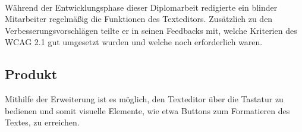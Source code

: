 \mbox{}\\Während der Entwicklungsphase dieser Diplomarbeit redigierte ein blinder Mitarbeiter regelmäßig die Funktionen des Texteditors. Zusätzlich zu den Verbesserungsvorschlägen teilte er in seinen Feedbacks mit, welche Kriterien des WCAG 2.1 gut umgesetzt wurden und welche noch erforderlich waren.

\subsection{Produkt}
Mithilfe der Erweiterung ist es möglich, den Texteditor über die Tastatur zu bedienen und somit visuelle Elemente, wie etwa Buttons zum Formatieren des Textes, zu erreichen. 